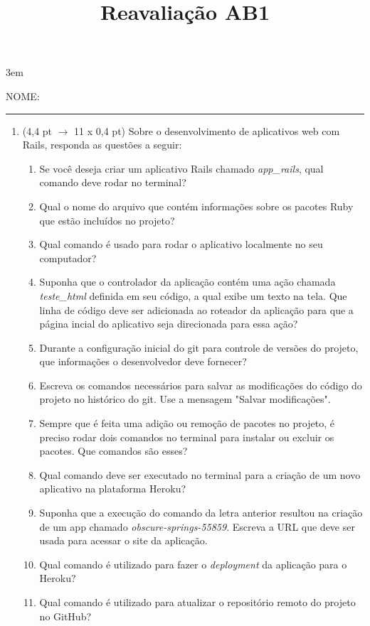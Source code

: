 \documentclass[a4paper,10pt]{article}
\title{Reavaliação AB1}
\begin{document}
\maketitle

\emergencystretch 3em



NOME: \rule{.85\textwidth}{0.1mm}

\begin{multicols*}{2}
\setlength{\leftmargini}{0pt}
\begin{enumerate}
  \item (4,4 pt $\rightarrow$ 11 x 0,4 pt) Sobre o desenvolvimento de aplicativos web com Rails, responda as questões a seguir:

  \begin{enumerate}
    \item Se você deseja criar um aplicativo Rails chamado \textit{app\_rails}, qual comando deve rodar no terminal? %
    \item Qual o nome do arquivo que contém informações sobre os pacotes Ruby que estão incluídos no projeto? %
    \item Qual comando é usado para rodar o aplicativo localmente no seu computador? %
    \item Suponha que o controlador da aplicação contém uma ação chamada \textit{teste\_html} definida em seu código, a qual exibe um texto na tela. Que linha de código deve ser adicionada ao roteador da aplicação para que a página incial do aplicativo seja direcionada para essa ação? %
    \item Durante a configuração inicial do git para controle de versões do projeto, que informações o desenvolvedor deve fornecer? %
    \item Escreva os comandos necessários para salvar as modificações do código do projeto no histórico do git. Use a mensagem "Salvar modificações". %
    \item Sempre que é feita uma adição ou remoção de pacotes no projeto, é preciso rodar dois comandos no terminal para instalar ou excluir os pacotes. Que comandos são esses? %
    \item Qual comando deve ser executado no terminal para a criação de um novo aplicativo na plataforma Heroku? %
    \item Suponha que a execução do comando da letra anterior resultou na criação de um app chamado \textit{obscure-springs-55859}. Escreva a URL que deve ser usada para acessar o site da aplicação. %
    \item Qual comando é utilizado para fazer o \textit{deployment} da aplicação para o Heroku? %
    \item Qual comando é utilizado para atualizar o repositório remoto do projeto no GitHub? %
  \end{enumerate}


\end{enumerate}
\end{multicols*}
\end{document}
